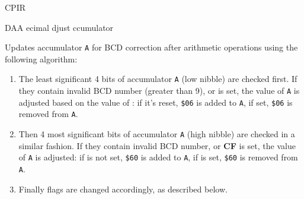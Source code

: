 \begin{basedescript}{
	\desclabelstyle{\multilinelabel}
	\desclabelwidth{3cm}}
\begin{DetailItem}{CPIR}{}
	\end{DetailItem}

	\pagebreak



	\begin{DetailItem}{DAA}{}
		{ecimal djust ccumulator}
		{}

		Updates accumulator {\tt A} for BCD correction after arithmetic operations using the following algorithm:

		\begin{enumerate}
			\item The least significant 4 bits of accumulator {\tt A} (low nibble) are checked first. If they contain invalid BCD number (greater than 9), or \FlagHF{} is set, the value of {\tt A} is adjusted based on the value of \FlagNF{}: if it's reset, {\tt \$06} is added to {\tt A}, if set, {\tt \$06} is removed from {\tt A}.
			\item Then 4 most significant bits of accumulator {\tt A} (high nibble) are checked in a similar fashion. If they contain invalid BCD number, or \textbf{CF} is set, the value of {\tt A} is adjusted: if \FlagNF{} is not set, {\tt \$60} is added to {\tt A}, if \FlagNF{} is set, {\tt \$60} is removed from {\tt A}.
			\item Finally flags are changed accordingly, as described below.
		\end{enumerate}


		

\end{DetailItem}
\end{basedescript}
